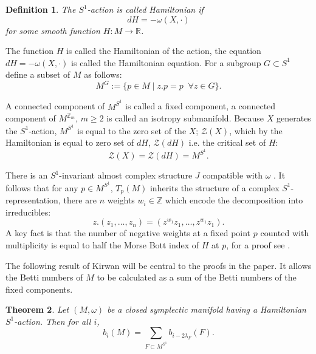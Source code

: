 \documentclass[12pt]{article}
\newtheorem{theorem}{Theorem}[section]
\newtheorem{definition}[theorem]{Definition}
\begin{document}
\begin{definition}
The $S^1$-action is called Hamiltonian if $$dH = -\omega(X,\cdot)$$ for some smooth function $H:M \rightarrow \mathbb{R}$.
\end{definition}
The function $H$ is called the Hamiltonian of the action, the equation $dH = -\omega(X,\cdot)$ is called the Hamiltonian equation. For a subgroup $G \subset S^1$ define a subset of $M$ as follows: $$M^{G} := \{p \in M \mid z.p = p \;\; \forall z \in G\}.$$ 

A connected component of $M^{S^1}$ is called a fixed component, a connected component of $M^{\mathbb{Z}_m}$, $m \geq 2$ is called an isotropy submanifold. Because $X$ generates the $S^1$-action, $M^{S^1}$ is equal to the zero set of the $X$;  $\mathcal{Z}(X)$, which by the Hamiltonian is equal to zero set of $dH$, $\mathcal{Z}(dH)$ i.e. the critical set of $H$:
$$\mathcal{Z}(X) = \mathcal{Z}(dH) = M^{S^1}.$$

There is an $S^1$-invariant almost complex structure $J$ compatible with $\omega$ \cite[Lemma 5.52]{MS}. It follows that for any $p \in M^{S^1}$, $T_{p}(M)$ inherits the structure of a complex $S^1$-representation, there are $n$ weights $w_{i} \in \mathbb{Z}$ which encode the decomposition into irreducibles: $$z.(z_1,\ldots,z_n) = (z^{w_1}z_1, \ldots, z^{w_1}z_1). $$ A key fact is that the number of negative weights at a fixed point $p$ counted with multiplicity is equal to half the Morse Bott index of $H$ at $p$, for a proof see \cite[Lemma 5.54]{MS}.

The following result of Kirwan \cite{Ki} will be central to the proofs in the paper. It allows the Betti numbers of $M$ to be calculated as a sum of the Betti numbers of the fixed components. 

\begin{theorem}  \cite{Ki} \label{homologyloc}
Let $(M,\omega)$ be a closed symplectic manifold having a Hamiltonian $S^1$-action. Then for all $i$, $$b_{i}(M) = \sum_{F \subset M^{S^1}} b_{i-2\lambda_{F}}(F). $$
\end{theorem}
\end{document}
